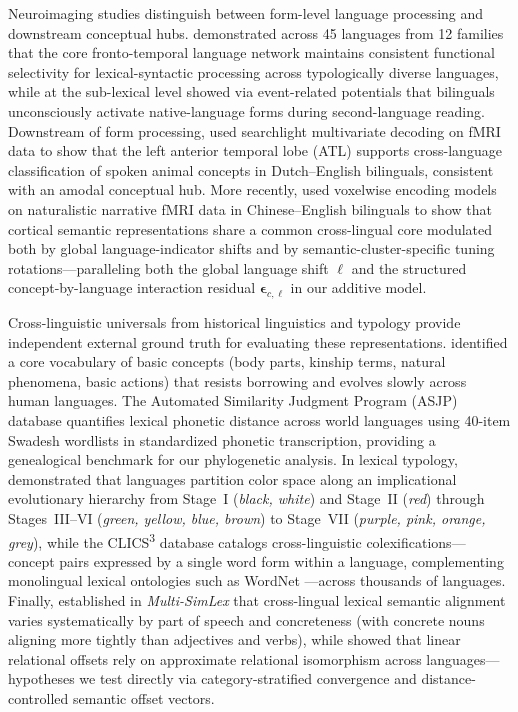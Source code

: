 Neuroimaging studies distinguish between form-level language processing and downstream conceptual hubs.
\citet{malikmoraleda2022} demonstrated across 45 languages from 12 families that the core fronto-temporal language network maintains consistent functional selectivity for lexical-syntactic processing across typologically diverse languages, while at the sub-lexical level \citet{thierry2007} showed via event-related potentials that bilinguals unconsciously activate native-language forms during second-language reading.
Downstream of form processing, \citet{correia2014} used searchlight multivariate decoding on fMRI data to show that the left anterior temporal lobe (ATL) supports cross-language classification of spoken animal concepts in Dutch--English bilinguals, consistent with an amodal conceptual hub.
More recently, \citet{deniz2025} used voxelwise encoding models on naturalistic narrative fMRI data in Chinese--English bilinguals to show that cortical semantic representations share a common cross-lingual core modulated both by global language-indicator shifts and by semantic-cluster-specific tuning rotations—paralleling both the global language shift $\boldsymbol{\ell}$ and the structured concept-by-language interaction residual $\boldsymbol{\epsilon}_{c,\ell}$ in our additive model.

Cross-linguistic universals from historical linguistics and typology provide independent external ground truth for evaluating these representations.
\citet{swadesh1952} identified a core vocabulary of basic concepts (body parts, kinship terms, natural phenomena, basic actions) that resists borrowing and evolves slowly across human languages.
The Automated Similarity Judgment Program (ASJP) database \citep{wichmann2022,jaeger2018} quantifies lexical phonetic distance across world languages using 40-item Swadesh wordlists in standardized phonetic transcription, providing a genealogical benchmark for our phylogenetic analysis.
In lexical typology, \citet{berlin1969} demonstrated that languages partition color space along an implicational evolutionary hierarchy from Stage~I (\emph{black, white}) and Stage~II (\emph{red}) through Stages~III--VI (\emph{green, yellow, blue, brown}) to Stage~VII (\emph{purple, pink, orange, grey}), while the CLICS\textsuperscript{3} database \citep{list2018,rzymski2020} catalogs cross-linguistic colexifications---concept pairs expressed by a single word form within a language, complementing monolingual lexical ontologies such as WordNet \citep{miller1995}---across thousands of languages.
Finally, \citet{vulic2020} established in \emph{Multi-SimLex} that cross-lingual lexical semantic alignment varies systematically by part of speech and concreteness (with concrete nouns aligning more tightly than adjectives and verbs), while \citet{mikolov2013} showed that linear relational offsets rely on approximate relational isomorphism across languages—hypotheses we test directly via category-stratified convergence and distance-controlled semantic offset vectors.
